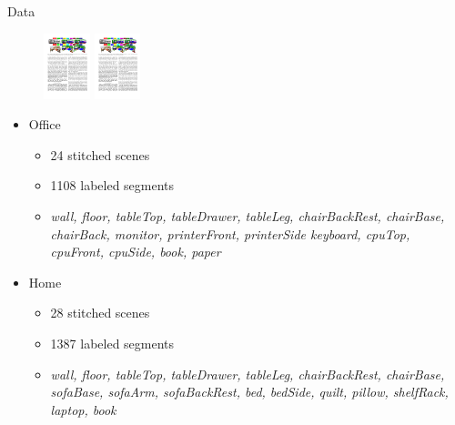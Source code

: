 \documentclass{beamer}
\begin{document}
\begin{frame}{Data}
	\begin{figure}
	\includegraphics[width=0.5\linewidth,height=0.75in]{office_scene.pdf}
	\includegraphics[width=0.5\linewidth,height=0.75in]{home_scene.pdf}
	\end{figure}

   \begin{itemize}
   \item Office 

   	\begin{itemize}
	\item 24 stitched scenes
	\item 1108 labeled segments
	\item {\scriptsize  \emph{wall, floor, tableTop, tableDrawer, tableLeg, chairBackRest, chairBase, chairBack, monitor, printerFront, printerSide keyboard, cpuTop, cpuFront, cpuSide, book, paper}}
	\end{itemize}



   \item Home
   	\begin{itemize}
   	\item  28 stitched scenes
	\item 1387 labeled segments
	\item {\scriptsize  \emph{wall, floor, tableTop, tableDrawer, tableLeg, chairBackRest, chairBase, sofaBase, sofaArm, sofaBackRest, bed, bedSide, quilt, pillow, shelfRack, laptop, book }}
	\end{itemize} 
\end{itemize}

\end{frame}
\end{document}

